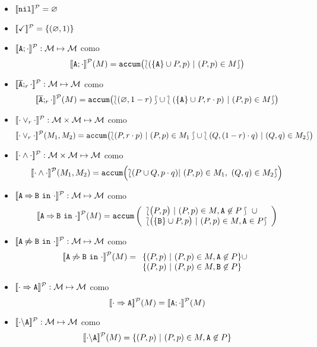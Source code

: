   \begin{itemize}
  \item $[\![\mathtt{nil}]\!]^{\cal P}=\varnothing$
  \item $[\![\checkmark]\!]^{\cal P}=\{(\varnothing,1)\}$
  \item 
    $[\![\mathtt{A};\cdot]\!]^{\cal P}:{\cal M}\mapsto{\cal M}$
    como
    $$[\![\mathtt{A};\cdot]\!]^{\cal P}(M)= 
      \mathtt{accum}\bigl(\lbag(\{\mathtt{A}\}\cup P,p)\ |\ (P,p)\in M\rbag\bigr)
         $$

  \item 
    $[\![\overline{\mathtt{A}};_{r}\cdot]\!]^{\cal P}:{\cal M}\mapsto{\cal M}$
    como
    $$[\![\overline{\mathtt{A}};_{r}\cdot]\!]^{\cal P}(M)=
                \mathtt{accum}\bigl(\lbag(\varnothing , 1-r )\rbag\cup\lbag (\{\mathtt{A}\}\cup P, r\cdot p ) \ |\ (P,p) \in M\rbag\bigr)$$

  \item 
    $[\![\cdot\mathbin{\lor}_{r}\cdot]\!]^{\cal P}:{\cal M}\times{\cal M}\mapsto{\cal M}$
    como 
    $$[\![\cdot\mathbin{\lor}_{r}\cdot]\!]^{\cal P}(M_{1},M_{2})=\mathtt{accum}\bigl(\lbag(P,r\cdot p  ) \ |\ (P,p) \in
    M_{1}\rbag \cup \lbag(Q, (1-r)\cdot q  ) \ |\ (Q,q) \in M_{2}\rbag\bigr) $$
  \item 
    $[\![\cdot\mathbin{\wedge}\cdot]\!]^{\cal P}:{\cal M}\times{\cal M}\mapsto{\cal M}$
    como 
    $$
        [\![\cdot\mathbin{\wedge}\cdot]\!]^{\cal P}(M_{1},M_{2})= \mathtt{accum}\Bigl(
                \lbag (P\cup Q, p\cdot q)  |\ (P,p) \in M_{1},\ (Q,q) \in M_{2}\rbag\Bigr)
    $$
    
  \item  
    $[\![\mathtt{A}\mathbin{\Rightarrow}\mathtt{B}\ \mathtt{in}\ \cdot]\!]^{\cal P}:{\cal M}\mapsto{\cal M}$
    como 
    $$[\![\mathtt{A}\mathbin{\Rightarrow}\mathtt{B}\ \mathtt{in}\ \cdot]\!]^{\cal P}(M)=\mathtt{accum}\left(\begin{array}{l}
      \lbag\bigl(P,p\bigr)\ |\  (P,p)\in M, \mathtt{A}\not\in P\rbag\ \cup\\
      \lbag\bigl(\{\mathtt{B}\}\cup P ,p\bigr)\ |\ (P,p)\in M, \mathtt{A}\in P\rbag \\ 
      \end{array}\right)$$
  \item  
    $[\![\mathtt{A}\mathbin{\not\Rightarrow}\mathtt{B}\ \mathtt{in}\ \cdot]\!]^{\cal P}:{\cal M}\mapsto{\cal M}$
    como 
    $$[\![\mathtt{A}\mathbin{\not\Rightarrow}\mathtt{B}\ \mathtt{in}\ \cdot]\!]^{\cal P}(M)=\begin{array}[t]{l}
      \{(P,p)\ |\ (P,p)\in M, \mathtt{A}\not\in P\}\cup\\
      \{(P,p)\ |\ (P,p)\in M, \mathtt{B}\not\in P\}
      \end{array}$$
%
%
    \item $[\![\cdot\Rightarrow\mathtt{A}]\!]^{\cal P}:{\cal M}\mapsto{\cal M}$
    como 
    $$[\![\cdot\Rightarrow\mathtt{A}]\!]^{\cal P}(M) = [\![\mathtt{A};{\cdot}]\!]^{\cal P}(M)
    $$
%
%
    \item   $[\![\cdot\backslash\mathtt{A}]\!]^{\cal P}:{\cal M}\mapsto{\cal M}$
    como 
    $$[\![\cdot\backslash\mathtt{A}]\!]^{\cal P}(M) = \{(P,p)\ |\ (P, p) \in M, \mathtt{A}\not\in P      \}$$
  \end{itemize}
\edfn

